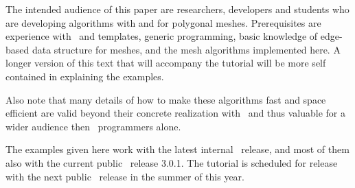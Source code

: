The intended audience of this paper are researchers, developers and
students
who are
developing algorithms with and for polygonal meshes. Prerequisites are
experience with \CC\ and templates, generic programming, basic
knowledge of edge-based data structure for meshes, and the mesh
algorithms implemented here. A longer version of this text that will
accompany the tutorial will be more self contained in explaining the
examples.

Also note that many details of how to make these algorithms fast and
space efficient are valid beyond their concrete realization with
\cgal\ and thus valuable for a wider audience then \cgal\ programmers
alone.

The examples given here work with the latest internal \cgal\ release,
and most of them also with the current public \cgal\ release
3.0.1. The tutorial is scheduled for release with the next public
\cgal\ release in the summer of this year.






